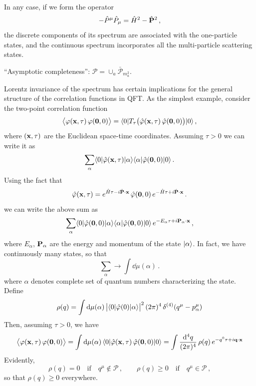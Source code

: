 In any case, if we form the operator
\[
-\hat P^\mu\hat P_\mu=\hat H^2-\hat{\mathbf{P}}^2\,,
\]
the discrete components of its spectrum are associated with the one-particle
states, and the continuous spectrum incorporates all the multi-particle scattering
states.

``Asymptotic completeness'': $\mathcal P=\cup_a\bar{\mathcal P}_{m_a^2}$.

Lorentz invariance of the spectrum has certain implications for the general
structure of the correlation functions in QFT. As the simplest example, consider the
two-point correlation function
\[
\bigl\langle\varphi(\mathbf{x},\tau)\,\varphi(\mathbf0,0)\bigr\rangle=\langle 0|T_\tau\bigl(\hat\varphi(\mathbf{x},\tau)\,\hat\varphi(\mathbf0,0)\bigr)|0\rangle\,,
\]
where $(\mathbf{x},\tau)$ are the Euclidean space-time coordinates. Assuming $\tau>0$ we can
write it as
\[
\sum_\alpha\langle 0|\hat\varphi(\mathbf{x},\tau)|\alpha\rangle\langle \alpha|\hat\varphi(\mathbf0,0)|0\rangle\,.
\]
Using the fact that
\[
\hat\varphi(\mathbf{x},\tau)=e^{\hat H\tau-i\hat{\mathbf{P}}\cdot\mathbf{x}}\,\hat\varphi(\mathbf0,0)\,e^{-\hat H\tau+i\hat{\mathbf{P}}\cdot\mathbf{x}}\,.
\]
we can write the above sum as
\[
\sum_\alpha\langle 0|\hat\varphi(\mathbf0,0)|\alpha\rangle\langle \alpha|\hat\varphi(\mathbf0,0)|0\rangle\,e^{-E_\alpha\tau+i\mathbf{P}_\alpha\cdot\mathbf{x}}\,,
\]
where $E_\alpha$, $\mathbf{P}_\alpha$ are the energy and momentum of the state
$|\alpha\rangle$. In fact, we have continuously many states, so that
\[
\sum_\alpha\to\int \dd\mu(\alpha)\,.
\]
where $\alpha$ denotes complete set of quantum numbers characterizing the state.
Define
\begin{equation}\label{eq:rhodef}
\rho(q)=\int \mathop{}\!\mathrm{d}\mu(\alpha)\,\bigl|\langle 0|\hat\varphi(0)|\alpha\rangle\bigr|^2\,(2\pi)^4\,\delta^{(4)}(q^\mu-p^\mu_\alpha)
\end{equation}
Then, assuming $\tau>0$, we have
\begin{equation}\label{eq:spectralrep}
\bigl\langle\varphi(\mathbf{x},\tau)\,\varphi(\mathbf0,0)\bigr\rangle=\int \mathop{}\!\mathrm{d}\mu(\alpha)\,\langle 0|\hat\varphi(\mathbf{x},\tau)\,\hat\varphi(\mathbf0,0)|0\rangle
=\int\frac{\mathop{}\!\mathrm{d}^4q}{(2\pi)^4}\,\rho(q)\,e^{-q^0\tau+i\mathbf{q}\cdot\mathbf{x}}
\end{equation}
Evidently,
\[
\rho(q)=0\quad\text{if}\quad q^\mu\notin\mathcal P\,,\qquad\rho(q)\ge0\quad\text{if}\quad q^\mu\in\mathcal P\,,
\]
so that $\rho(q)\ge0$ everywhere.

